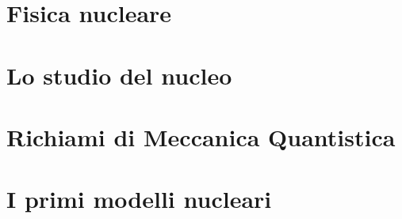\documentclass{tufte-book} %
\theoremstyle{definition}
\theoremstyle{theorem}
\theoremstyle{plain}
\theoremstyle{remark}
\theoremstyle{remark}
\begin{document}





\cleardoublepage


\cleardoublepage

\setcounter{chapter}{1}

\chapter{Fisica nucleare}\label{ch:fisica-nucleare}

       
\setcounter{chapter}{2}
\setcounter{section}{0}

\chapter{Lo studio del nucleo}\label{ch:studio-del-nucleo}

       
\setcounter{chapter}{3}
\setcounter{section}{0}

\chapter{Richiami di Meccanica Quantistica}\label{ch:richiami-qm}


\setcounter{chapter}{4}
\setcounter{section}{0}

\chapter{I primi modelli nucleari}\label{ch:modelli-nucleari}
\end{document}
